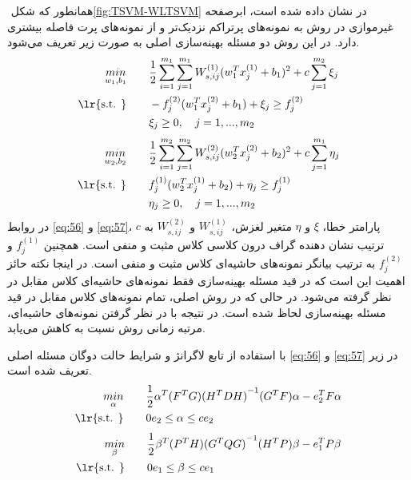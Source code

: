 همانطور که شکل ‏\ref{fig:TSVM-WLTSVM} در نشان داده شده است، ابرصفحه غیرموازی در روش  به نمونه‌های پرتراکم نزدیک‌تر و از نمونه‌های پرت فاصله بیشتری دارد. در این روش دو مسئله بهینه‌سازی اصلی به صورت زیر تعریف می‌شود.
\begin{equation}
\begin{split}
\mathop{{ min}}\limits_{w_{1} ,b_{1}} \qquad & \frac{1}{2}\sum\limits_{i=1}^{m_{1}}{\sum\limits_{j=1}^{m_{1}}{W^{(1)}_{s,ij}(w^{T}_{1}x^{(1)}_{j}+b_{1})^{2}}}+c\sum\limits_{j=1}^{m_{2}}\xi_j \\
\textrm{\lr{s.t. }} \qquad & -f^{(2)}_{j}(w^{T}_{1}x^{(2)}_{j}+b_{1})+\xi_{j} \ge f^{(2)}_{j} \\
& \xi_{j} \ge 0,\quad j=1,...,m_{2}
\end{split}
\label{eq:56}
\end{equation}
\begin{equation}
\begin{split}
\mathop{{ min}}\limits_{w_{2} ,b_{2}} \qquad & \frac{1}{2}\sum\limits_{i=1}^{m_{2}}{\sum\limits_{j=1}^{m_{2}}{W^{(2)}_{s,ij}(w^{T}_{2}x^{(2)}_{j}+b_{2})^{2}}}+c\sum\limits_{j=1}^{m_{1}}\eta_j \\
\textrm{\lr{s.t. }} \qquad & f^{(1)}_{j}(w^{T}_{2}x^{(1)}_{j}+b_{2})+\eta_{j} \ge f^{(1)}_{j} \\
& \eta_{j} \ge 0,\quad j=1,...,m_{2}
\end{split}
\label{eq:57}
\end{equation}
در روابط \ref{eq:56} و \ref{eq:57}،  $c$ پارامتر خطا،  $\xi$ و $\eta$ متغیر لغزش،  $W_{s,ij}^{(1)}$ و  $W_{s,ij}^{(2)}$ به ترتیب نشان دهنده گراف درون کلاسی کلاس مثبت و منفی است. همچنین  $f_{j}^{(1)}$ و $f_{j}^{(2)}$ به ترتیب بیانگر نمونه‌های حاشیه‌ای کلاس مثبت و منفی است. در اینجا نکته حائز اهمیت این است که در قید مسئله بهینه‌سازی فقط نمونه‌های حاشیه‌ای کلاس مقابل در نظر گرفته می‌شود. در حالی که در روش  اصلی، تمام نمونه‌های کلاس مقابل در قید مسئله بهینه‌سازی لحاظ شده است. در نتیجه با در نظر گرفتن نمونه‌های حاشیه‌ای، مرتبه زمانی روش  نسبت به  کاهش می‌یابد.

با استفاده از تابع لاگرانژ و شرایط  حالت دوگان مسئله اصلی \ref{eq:56} و \ref{eq:57} در زیر تعریف شده است.
\begin{equation}
\begin{split}
\mathop{{ min}}\limits_{\alpha} \qquad & \frac{1}{2}{{\alpha }^{T}}(F^{T}G){{({{H}^{T}}DH)}^{-1}}{({G}^{T}F)}\alpha -e_{2}^{T}F\alpha  \\
\textrm{\lr{s.t. }} \qquad & 0{{e}_{2}}\le \alpha \le {{c}}{{e}_{2}}
\end{split}
\label{eq:58}
\end{equation}
\begin{equation}
\begin{split}
\mathop{{ min}}\limits_{\beta} \qquad & \frac{1}{2}{{\beta }^{T}}(P^{T}H){{({{G}^{T}}QG)}^{-1}}{({H}^{T}P)}\beta -e_{1}^{T}P\beta  \\
\textrm{\lr{s.t. }} \qquad & 0{{e}_{1}}\le \beta \le {{c}}{{e}_{1}}
\end{split}
\label{eq:59}
\end{equation}


